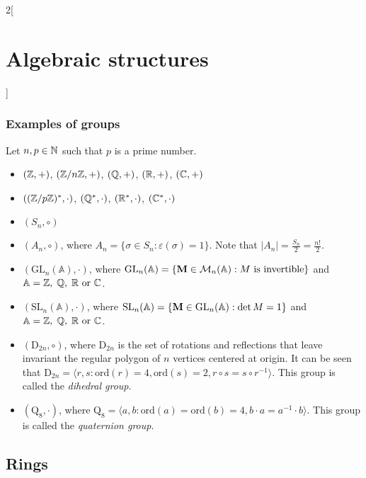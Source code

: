 \documentclass[../../../main.tex]{subfiles}
\begin{document}
\begin{multicols}{2}[\section{Algebraic structures}]
\subsubsection{Examples of groups}\label{AS-examples}
Let $n,p\in\mathbb{N}$ such that $p$ is a prime number.
\begin{itemize}
    \item $(\mathbb{Z},+)$, $(\mathbb{Z}/n\mathbb{Z},+)$, $(\mathbb{Q},+)$, $(\mathbb{R},+)$, $(\mathbb{C},+)$
    \item $((\mathbb{Z}/p\mathbb{Z})^*,\cdot)$, $(\mathbb{Q}^*,\cdot)$, $(\mathbb{R}^*,\cdot)$, $(\mathbb{C}^*,\cdot)$
    \item $(S_n,\circ)$
    \item $(A_n,\circ)$, where $A_n=\{\sigma\in S_n:\varepsilon(\sigma)=1\}$. Note that $|A_n|=\frac{S_n}{2}=\frac{n!}{2}$.
    \item $(\text{GL}_n(\mathbb{A}),\cdot)$, where $\text{GL}_n(\mathbb{A})=\{\mathblack{M}\in\mathcal{M}_n(\mathbb{A}):M\ \text{is invertible}\}$ and $\mathbb{A}=\mathbb{Z},\;\mathbb{Q},\;\mathbb{R}\text{ or }\mathbb{C}$.
    \item $(\text{SL}_n(\mathbb{A}),\cdot)$, where $\text{SL}_n(\mathbb{A})=\{\vb{M}\in\text{GL}_n(\mathbb{A}):\det M=1\}$ and $\mathbb{A}=\mathbb{Z},\;\mathbb{Q},\;\mathbb{R}\text{ or }\mathbb{C}$.
    \item $(\text{D}_{2n},\circ)$, where $\text{D}_{2n}$ is the set of rotations and reflections that leave invariant the regular polygon of $n$ vertices centered at origin. It can be seen that $\text{D}_{2n}=\langle r,s:\text{ord}(r)=4,\text{ord}(s)=2,r\circ s=s\circ r^{-1}\rangle$. This group is called the \textit{dihedral group}.
    \item $(\text{Q}_8,\cdot)$, where $\text{Q}_8=\langle a,b:\text{ord}(a)=\text{ord}(b)=4,b\cdot a=a^{-1}\cdot b\rangle$. This group is called the \textit{quaternion group}.
\end{itemize}
\subsection{Rings}\label{AS-R}

\end{multicols}
\end{document}
